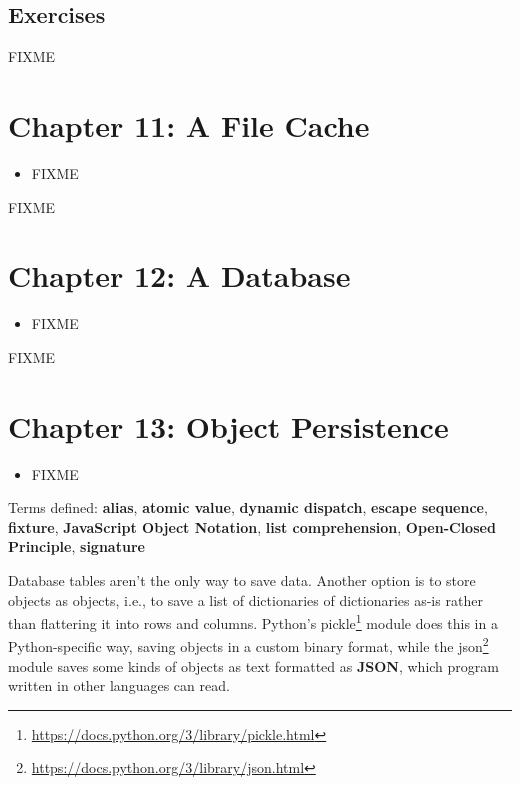 \documentclass{scrbook}
\newcommand{\glossref}[1]{\textbf{#1}}
\newcommand{\hreffoot}[2]{{#1}\footnote{\href{#2}{#2}}}
\begin{document}
\section{Exercises}\label{server-exercises}


FIXME

\chapter{Chapter 11: A File Cache}\label{filecache}

\begin{itemize}

\item FIXME

\end{itemize}


FIXME

\chapter{Chapter 12: A Database}\label{database}

\begin{itemize}

\item FIXME

\end{itemize}


FIXME

\chapter{Chapter 13: Object Persistence}\label{persistence}

\begin{itemize}

\item FIXME

\end{itemize}


\noindent 
    Terms defined:
    \glossref{alias}, \glossref{atomic value}, \glossref{dynamic dispatch}, \glossref{escape sequence}, \glossref{fixture}, \glossref{JavaScript Object Notation}, \glossref{list comprehension}, \glossref{Open-Closed Principle}, \glossref{signature}



Database tables aren't the only way to save data.
Another option is to store objects as objects,
i.e.,
to save a list of dictionaries of dictionaries as-is
rather than flattering it into rows and columns.
Python's \hreffoot{pickle}{https://docs.python.org/3/library/pickle.html} module does this in a Python-specific way,
saving objects in a custom binary format,
while the \hreffoot{json}{https://docs.python.org/3/library/json.html} module saves some kinds of objects as text
formatted as \glossref{JSON},
which program written in other languages can read.
\end{document}
